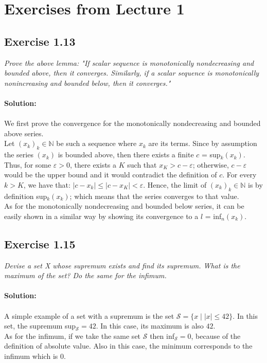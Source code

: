 \section{Exercises from Lecture 1}

\subsection{Exercise 1.13}
\emph{Prove the above lemma:  "If scalar sequence is monotonically nondecreasing and bounded above, then it converges. Similarly, if a scalar sequence is monotonically nonincreasing and bounded below, then it converges."}\\
\\
\textbf{Solution:} \\
\\
We first prove the convergence for the monotonically nondecreasing and bounded above series.\\
Let $(x_k)_k \in \mathbb{N}$ be such a sequence where $x_k$ are its terms. Since by assumption the series $(x_k)$ is bounded above, then there exists a finite $c $ = sup$_k (x_k)$. Thus, for some $\varepsilon > 0$, there exists a $K$ such that $x_K > c - \varepsilon$; otherwise, $c - \varepsilon$ would be the upper bound and it would contradict the definition of $c$. For every $k > K$, we have that: $|c - x_k| \leq |c - x_K| < \varepsilon$. Hence, the limit of $(x_k)_k \in \mathbb{N}$ is by definition sup$_k(x_k)$; which means that the series converges to that value.\\
As for the monotonically nondecreasing and bounded below series, it can be easily shown in a similar way by showing its convergence to a $l$ = inf$_n(x_k)$.
\QEDB

\subsection{Exercise 1.15}
\emph{Devise a set X whose supremum exists and find its supremum. What is the maximum of the set? Do the same for the infimum.}\\
\\
\textbf{Solution:}\\
\\
A simple example of a set with a supremum is the set $\mathcal{S} = \{x \mid |x| \leq 42\}$. In this set, the supremum sup$_{\mathcal{S}} = 42$. In this case, its maximum is also $42$.\\
As for the infimum, if we take the same set $\mathcal{S}$ then inf$_{\mathcal{S}} = 0$, because of the definition of absolute value. Also in this case, the minimum corresponds to the infimum which is $0$.
\QEDB

